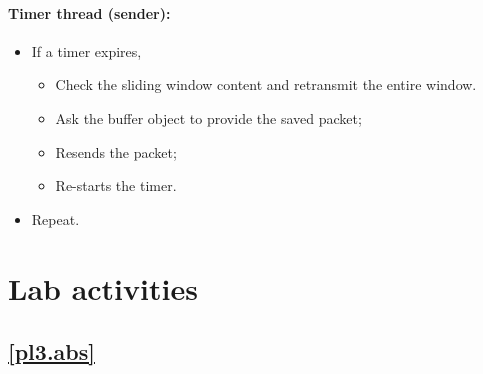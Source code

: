 \documentclass[12pt]{book}
\begin{document}
\paragraph{Timer thread (sender):}

\begin{itemize}
\item If a timer expires,
  \begin{itemize}
    \item Check the sliding window content and retransmit the entire window.
  \item Ask the buffer object to provide the saved packet;
  \item Resends the packet;
    \item Re-starts the timer.
  \end{itemize}
\item Repeat.
\end{itemize}

\section{Lab activities}\label{seqnr.se}

\subsection{\ref{pl3.abs}}
\end{document}
